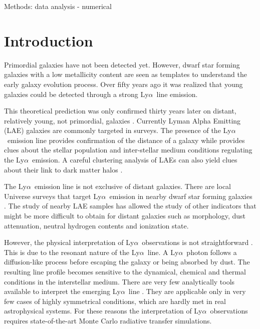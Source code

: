 \documentclass[a4,useAMS,usenatbib,usegraphicx]{mn2e}
\newcommand{\lya}{Ly$\alpha$}
\begin{document}
\begin{keywords}
Methods: data analysis - numerical 
\end{keywords}



\section{Introduction}
\label{sec:introduction}





Primordial galaxies have not been detected yet. 
However, dwarf star forming galaxies with a low metallicity content
are seen as templates to understand the early galaxy evolution process. 
Over fifty years ago \citep{PartridgePeebles} it was realized that
young galaxies could be detected through a strong \lya\ line
emission.  


This theoretical prediction was only confirmed thirty years later on
distant, relatively young, not primordial, galaxies \citep{1998ApJ...498L..93D}.
Currently Lyman Alpha Emitting (LAE) galaxies are commonly targeted
in surveys. 
The presence of the \lya\ emission line provides confirmation of
the distance of a galaxy while provides clues about the stellar
population and inter-stellar medium conditions regulating the
\lya\ emission.
A careful clustering analysis of LAEs can also yield clues about their link
to dark matter halos \cite{2016ApJ...828....5M}.

The \lya\ emission line is not exclusive of distant galaxies. 
There are local Universe surveys that target \lya\ emission in nearby dwarf star forming galaxies  \citep{LARS}. 
The study of nearby LAE samples has allowed the study of other
indicators that might be more difficult to obtain for distant galaxies
such as morphology, dust attenuation, neutral hydrogen contents and
ionization state.  

However, the physical interpretation of \lya\ observations is
not straightforward \citep{2015ApJ...805...14R}. 
This is due to the resonant nature of the \lya\ line. 
A \lya\ photon follows a diffusion-like process before escaping
the galaxy or being absorbed by dust. 
The resulting line profile becomes sensitive to the dynamical, chemical
and thermal conditions in the interstellar medium. 
There are very few analytically tools available to interpret the
emerging \lya\ line
\cite{Harrington73,1991ApJ...370L..85N,LoebRybicki,2006ApJ...645..792T}. 
They are applicable only in very few cases of highly symmetrical
conditions, which are hardly met in real astrophysical systems.
For these reasons the interpretation of \lya\ observations
requires state-of-the-art Monte Carlo radiative transfer simulations.   
\end{document}
